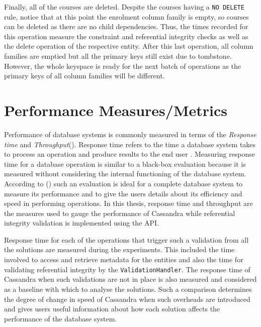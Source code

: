 \begin{description}
		Finally, all of the courses are deleted. Despite the courses having a \texttt{NO
		DELETE} rule, notice that at this point the enrolment column family is empty, so
		courses can be deleted as there are no child dependencies. Thus, the times
		recorded for this operation measure the constraint and referential integrity
		checks as well as the delete operation of the respective entity. After this last
		operation, all column families are emptied but all the primary keys still exist
		due to tombstone. However, the whole keyspace is ready for the next batch of
		operations as the primary keys of all column families will be different.
	
	
	\end{description}		


\section{Performance Measures/Metrics}
Performance of database systems is commonly measured in terms of the
\textit{Response time} and \textit{Throughput}().
Response time refers to the time  a database system takes to process an
operation and produce results to the end user . Measuring response time for a
database operation is similar to a black-box evaluation because it is measured 
without considering the internal functioning  of the database system. According
to () such an evaluation is ideal for a complete database
system to measure its performance and to give the users details about its 
efficiency and speed in performing operations. In this thesis, response time and
throughput are the measures used to gauge the performance of Cassandra
while referential integrity validation is implemented using the \ac{API}.

Response time for each of the  operations that trigger such a validation from
all the solutions are measured during the experiments. This included the time
involved to access and retrieve metadata for the entities and also the time for
validating referential integrity by the \texttt{ValidationHandler}. The response
time of Cassandra when such validations are not in place is also measured and
considered as a baseline with which to analyse the solutions. Such a comparison 
determines the degree of change in speed of Cassandra when such overheads are
introduced and gives users useful information about how each solution affects
the performance of the database system.

